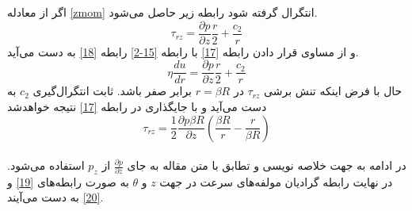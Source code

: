 اگر از معادله
\ref{zmom}
انتگرال گرفته شود رابطه زیر حاصل می‌شود.
\begin{equation}
	\label{17}
	\tau_{r z} = \frac{\partial p }{\partial z}\frac{r}{2} + \frac{c_2}{r}
\end{equation}
و از مساوی قرار دادن رابطه 
\ref{17}
با رابطه  
\ref{15-2}
رابطه
\ref{18}
به دست می‌آید.
\begin{equation}
	\label{18}
	\eta \frac{du}{dr} = \frac{\partial p }{\partial z}\frac{r}{2} + \frac{c_2}{r}
\end{equation}
حال 
با فرض اینکه تنش برشی $\tau_{r z}$ در $r = \beta R$ برابر صفر باشد. ثابت انتگرال‌گیری $c_2 $ به دست می‌آید و با جایگذاری در رابطه  
\ref{17} 
نتیجه خواهدشد
\begin{equation}
	\tau_{r z} = \frac{1}{2}\frac{\partial p \beta R}{\partial z}\left(\frac{\beta R}{r}-\frac{r}{\beta R}\right)
\end{equation}
\\
در ادامه به جهت خلاصه نویسی و تطابق با متن مقاله به جای 
$\frac{\partial p}{\partial z}$
از
$p_z$
استفاده می‌شود.
در نهایت رابطه گرادیان مولفه‌های سرعت در جهت $z$ و $\theta$ به صورت رابطه‌های
\ref{19}
و
\ref{20} 
به دست می‌آیند.

